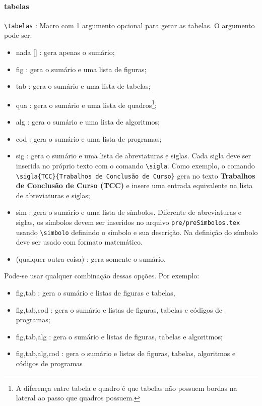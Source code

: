 \paragraph{tabelas\\}
\verb|\tabelas| : Macro com 1 argumento opcional para gerar as tabelas. O argumento pode ser:
\begin{itemize}
 \item nada [] : gera apenas o sumário;
 
 
 \item \textsf{fig} : gera o sumário e uma lista de figuras;
 \item \textsf{tab} : gera o sumário e uma lista de tabelas;
 \item \textsf{qua} : gera o sumário e uma lista de quadros\footnote{A diferença entre tabela e quadro é que tabelas não possuem bordas na lateral ao passo que quadros possuem.};
 \item \textsf{alg} : gera o sumário e uma lista de algoritmos;
 \item \textsf{cod} : gera o sumário e uma lista de programas;
 \item \textsf{sig} : gera o sumário e uma lista de abreviaturas e siglas. Cada sigla deve ser inserida no próprio texto com o comando \verb|\sigla|. Como exemplo, o comando \verb|\sigla{TCC}{Trabalhos de Conclusão de Curso}| gera no texto \textbf{Trabalhos de Conclusão de Curso (TCC)} e insere uma entrada equivalente na lista de abreviaturas e siglas;
 \item \textsf{sim} : gera o sumário e uma lista de símbolos. Diferente de abreviaturas e siglas, os símbolos devem ser inseridos no arquivo \verb|pre/preSimbolos.tex| usando \verb|\simbolo| definindo o símbolo e sua descrição. Na definição do símbolo deve ser usado com formato matemático.
 \item (qualquer outra coisa) : gera somente o sumário.
\end{itemize}

Pode-se usar qualquer combinação dessas opções. Por exemplo:
\begin{itemize}
 \item \textsf{fig,tab} : gera o sumário e listas de figuras e tabelas,
 \item \textsf{fig,tab,cod} : gera o sumário e listas de figuras, tabelas e códigos de programas;
 \item \textsf{fig,tab,alg} : gera o sumário e listas de figuras, tabelas e algoritmos;
 \item \textsf{fig,tab,alg,cod} : gera o sumário e listas de figuras, tabelas, algoritmos e códigos de programas
\end{itemize}

